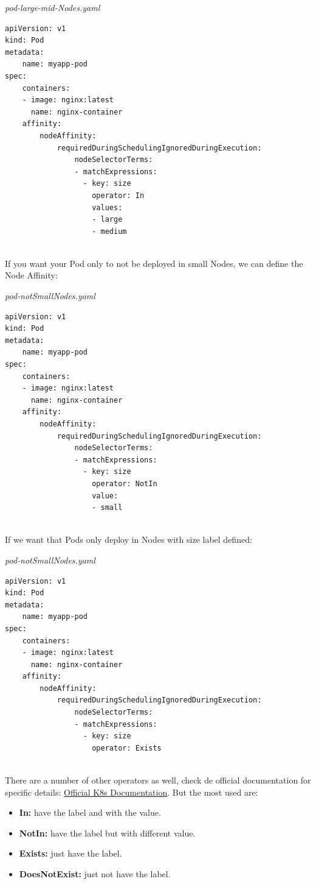 \documentclass{article}
\newenvironment{codetemplate}[1][]{%
  \mybasecolorbox[#1]
  \itshape
}{%
  \endmybasecolorbox
}
\begin{document}
\begin{codetemplate}{pod-large-mid-Nodes.yaml}
\begin{verbatim}
apiVersion: v1
kind: Pod
metadata:
    name: myapp-pod
spec:
    containers:
    - image: nginx:latest
      name: nginx-container
    affinity:
        nodeAffinity:
            requiredDuringSchedulingIgnoredDuringExecution:
                nodeSelectorTerms:
                - matchExpressions:
                  - key: size
                    operator: In
                    values:
                    - large
                    - medium
                    
\end{verbatim}
\end{codetemplate}

If you want your Pod only to not be deployed in small Nodes, we can define the Node Affinity:

\begin{codetemplate}{pod-notSmallNodes.yaml}
\begin{verbatim}
apiVersion: v1
kind: Pod
metadata:
    name: myapp-pod
spec:
    containers:
    - image: nginx:latest
      name: nginx-container
    affinity:
        nodeAffinity:
            requiredDuringSchedulingIgnoredDuringExecution:
                nodeSelectorTerms:
                - matchExpressions:
                  - key: size
                    operator: NotIn
                    value:
                    - small
                    
\end{verbatim}
\end{codetemplate}

If we want that Pods only deploy in Nodes with size label defined:

\begin{codetemplate}{pod-notSmallNodes.yaml}
\begin{verbatim}
apiVersion: v1
kind: Pod
metadata:
    name: myapp-pod
spec:
    containers:
    - image: nginx:latest
      name: nginx-container
    affinity:
        nodeAffinity:
            requiredDuringSchedulingIgnoredDuringExecution:
                nodeSelectorTerms:
                - matchExpressions:
                  - key: size
                    operator: Exists
                    
\end{verbatim}
\end{codetemplate}

There are a number of other operators as well, check de official documentation for specific details: \href{https://kubernetes.io/docs/concepts/scheduling-eviction/assign-pod-node/}{Official K8s Documentation}. But the most used are:
\begin{itemize}
    \item \textbf{In:} have the label and with the value.
    \item \textbf{NotIn:} have the label but with different value.
    \item \textbf{Exists:} just have the label.
    \item \textbf{DoesNotExist:} just not have the label.
\end{itemize}
\end{document}
